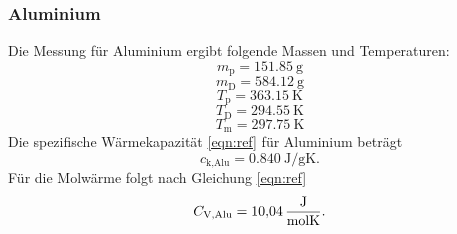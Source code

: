 \subsubsection{Aluminium}
Die Messung für Aluminium ergibt folgende Massen und Temperaturen:
\begin{equation*}
    m_\text{p} = \SI{151.85}{\gram}
\end{equation*}
\begin{equation*}
    m_\text{D} = \SI{584.12}{\gram}
\end{equation*}
\begin{equation*}
    T_\text{p} = \SI{363.15}{\kelvin}
\end{equation*}
\begin{equation*}
    T_\text{D} = \SI{294.55}{\kelvin}
\end{equation*}
\begin{equation*}
    T_\text{m} = \SI{297.75}{\kelvin}
\end{equation*}
Die spezifische Wärmekapazität \eqref{eqn:ref} für Aluminium beträgt
\begin{equation}
    c_\text{k,Alu} = \SI{0.840}{\joule/\gram\kelvin} .
\end{equation}
Für die Molwärme folgt nach Gleichung \eqref{eqn:ref}
\begin{equation}
    C_\text{V,Alu} = \SI{10.04}{\frac{\joule}{\mol\kelvin}} .
\end{equation}